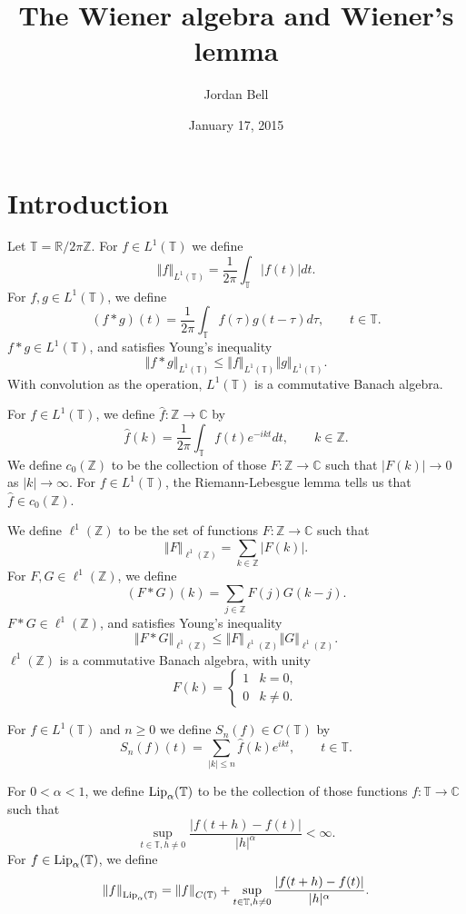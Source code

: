 \documentclass{article}
\newcommand{\Lip}{\ensuremath\mathrm{Lip}}
\newcommand{\norm}[1]{\left\Vert #1 \right\Vert}
\theoremstyle{definition}
\theoremstyle{definition}
\begin{document}
\title{The Wiener algebra and Wiener's lemma}
\author{Jordan Bell}
\date{January 17, 2015}

\maketitle

\section{Introduction}
Let $\mathbb{T}=\mathbb{R} / 2\pi \mathbb{Z}$.
For $f \in L^1(\mathbb{T})$ we define
\[
\norm{f}_{L^1(\mathbb{T})} = \frac{1}{2\pi} \int_\mathbb{T} |f(t)| dt.
\]
For $f,g \in L^1(\mathbb{T})$, we define
\[
(f*g)(t) = \frac{1}{2\pi} \int_{\mathbb{T}} f(\tau)g(t-\tau) d\tau, \qquad t \in \mathbb{T}.
\]
$f*g \in L^1(\mathbb{T})$, and  satisfies Young's inequality
\[
\norm{f*g}_{L^1(\mathbb{T})} \leq \norm{f}_{L^1(\mathbb{T})}
\norm{g}_{L^1(\mathbb{T})}.
\]
With convolution as the operation, $L^1(\mathbb{T})$ is a commutative Banach algebra.


For $f \in L^1(\mathbb{T})$, we define $\hat{f}:\mathbb{Z} \to \mathbb{C}$ by
\[
\hat{f}(k) = \frac{1}{2\pi} \int_{\mathbb{T}} f(t)  e^{-ikt} dt, \qquad k \in \mathbb{Z}.
\]
We define $c_0(\mathbb{Z})$ to be the collection of those $F:\mathbb{Z} \to \mathbb{C}$ such that
$|F(k)| \to 0$ as $|k| \to \infty$. For $f \in L^1(\mathbb{T})$, the Riemann-Lebesgue lemma tells us that
 $\hat{f} \in c_0(\mathbb{Z})$.

We define $\ell^1(\mathbb{Z})$ to be the set of functions $F:\mathbb{Z} \to \mathbb{C}$ such that
\[
\norm{F}_{\ell^1(\mathbb{Z})} = \sum_{k \in \mathbb{Z}} |F(k)|.
\]
For $F,G \in \ell^1(\mathbb{Z})$, we define
\[
(F*G)(k) = \sum_{j \in \mathbb{Z}} F(j)G(k-j).
\]
$F*G \in \ell^1(\mathbb{Z})$, and  satisfies Young's inequality
\[
\norm{F*G}_{\ell^1(\mathbb{Z})} \leq \norm{F}_{\ell^1(\mathbb{Z})}
\norm{G}_{\ell^1(\mathbb{Z})}.
\]
$\ell^1(\mathbb{Z})$ is a commutative Banach algebra, with unity
\[
F(k) = \begin{cases}
1&k=0,\\
0&k \neq 0.
\end{cases}
\]


For $f \in L^1(\mathbb{T})$ and $n \geq 0$ we define $S_n(f) \in C(\mathbb{T})$ by
\[
S_n(f)(t) = \sum_{|k| \leq n} \hat{f}(k) e^{ikt}, \qquad t \in \mathbb{T}.
\]

For $0<\alpha<1$, we define $\Lip_\alpha(\mathbb{T})$ to be the collection of those functions
$f:\mathbb{T} \to \mathbb{C}$ such that
\[
\sup_{t \in \mathbb{T}, h \neq 0} \frac{|f(t+h)-f(t)|}{|h|^\alpha}<\infty.
\] 
For $f \in \Lip_\alpha(\mathbb{T})$, we define
\[
\norm{f}_{\Lip_\alpha(\mathbb{T})} = \norm{f}_{C(\mathbb{T})}+
\sup_{t \in \mathbb{T}, h \neq 0} \frac{|f(t+h)-f(t)|}{|h|^\alpha}.
\]
\end{document}
